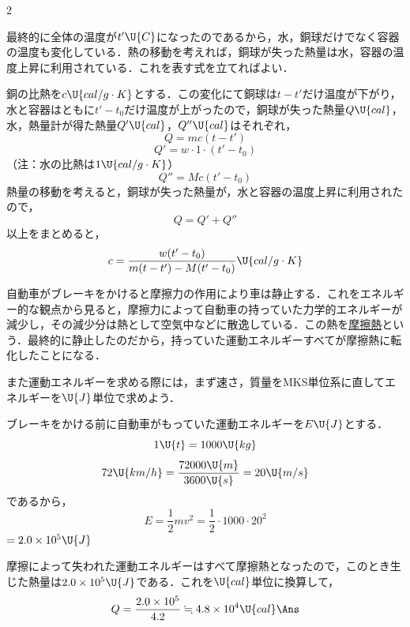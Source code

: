 \begin{multicols}{2}
\par\nopagebreak
\begin{sisin}
最終的に全体の温度が$t'\U{C}$になったのであるから，水，銅球だけでなく容器の温度も変化している．熱の移動を考えれば，銅球が失った熱量は水，容器の温度上昇に利用されている．これを表す式を立てればよい．
\end{sisin}
\par\nopagebreak
\hspace{1zw}銅の比熱を$c\U{cal/g\cdot K}$とする．この変化にて銅球は$t-t'$だけ温度が下がり，水と容器はともに$t'-t_0$だけ温度が上がったので，銅球が失った熱量$Q\U{cal}$，水，熱量計が得た熱量$Q'\U{cal}$，$Q''\U{cal}$はそれぞれ，
\[Q=mc(t-t')\]
\[Q'=w\cdot 1\cdot(t'-t_0)\]
\hspace*{2zw}（注：水の比熱は$1\U{cal/g\cdot K}$）
\[Q''=Mc(t'-t_0)\]
\hspace{1zw}熱量の移動を考えると，銅球が失った熱量が，水と容器の温度上昇に利用されたので，
\[Q=Q'+Q''\]
以上をまとめると，
\[c=\frac{w(t'-t_0)}{m(t-t')-M(t'-t_0)}\U{cal/g\cdot K}\]
\hspace*{\fill}\Ans

\par\nopagebreak
\begin{sisin}
自動車がブレーキをかけると摩擦力の作用により車は静止する．これをエネルギー的な観点から見ると，摩擦力によって自動車の持っていた力学的エネルギーが減少し，その減少分は熱として空気中などに散逸している．この熱を\underline{摩擦熱}という．最終的に静止したのだから，持っていた運動エネルギーすべてが摩擦熱に転化したことになる．

また運動エネルギーを求める際には，まず速さ，質量をMKS単位系に直してエネルギーを$\U{J}$単位で求めよう．
\end{sisin}
\par\nopagebreak
\hspace{1zw}ブレーキをかける前に自動車がもっていた運動エネルギーを$E\U{J}$とする．
\[1\U{t}=1000\U{kg}\]
\[72\U{km/h}=\frac{72000\U{m}}{3600\U{s}}=20\U{m/s}\]
であるから，
\[E=\frac{1}{2}mv^2=\frac{1}{2}\cdot 1000\cdot 20^2\]
\hspace*{2zw}$=2.0\times 10^5\U{J}$\par
\hspace{1zw}摩擦によって失われた運動エネルギーはすべて摩擦熱となったので，このとき生じた熱量は$2.0\times 10^5\U{J}$である．これを$\U{cal}$単位に換算して，
\[Q=\frac{2.0\times 10^5}{4.2}\fallingdotseq 4.8\times 10^4\U{cal}\Ans\]


\end{multicols}
